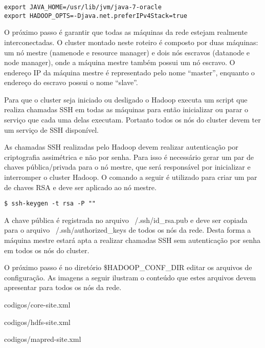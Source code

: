 \begin{apendicesenv}
\begin{lstlisting}[style=abnt,frame=single]
export JAVA_HOME=/usr/lib/jvm/java-7-oracle
export HADOOP_OPTS=-Djava.net.preferIPv4Stack=true 
\end{lstlisting}


O próximo passo é garantir que todas as máquinas da rede estejam realmente interconectadas. O cluster montado neste roteiro é composto por duas máquinas: um nó mestre (namenode e resource manager) e dois nós escravos (datanode e node manager), onde a máquina mestre também possui um nó escravo. O endereço IP da máquina mestre é representado pelo nome “master”, enquanto o endereço do escravo possui o nome “slave”.

Para que o cluster seja iniciado ou desligado o Hadoop executa um script que realiza chamadas SSH em todas as máquinas para então inicializar ou parar o serviço que cada uma delas executam. Portanto todos os nós do cluster devem ter um serviço de SSH disponível.

As chamadas SSH realizadas pelo Hadoop devem realizar autenticação por criptografia assimétrica e não por senha. Para isso é necessário gerar um par de chaves pública/privada para o nó mestre, que será responsável por inicializar e interromper o cluster Hadoop. O comando a seguir é utilizado para criar um par de chaves RSA e deve ser aplicado ao nó mestre.

\begin{lstlisting}[style=abnt,frame=single]
$ ssh-keygen -t rsa -P ""
\end{lstlisting}

A chave pública é registrada no arquivo ~/.ssh/id\_rsa.pub e deve ser copiada para o arquivo ~/.ssh/authorized\_keys de todos os nós da rede. Desta forma a máquina mestre estará apta a realizar chamadas SSH sem autenticação por senha em todos os nós do cluster.

O próximo passo é no diretório \$HADOOP\_CONF\_DIR editar os arquivos de configuração. As imagens a seguir ilustram o conteúdo que estes arquivos devem apresentar para todos os nós da rede.


		{codigos/core-site.xml}


		{codigos/hdfs-site.xml}


		{codigos/mapred-site.xml}


\end{apendicesenv}
